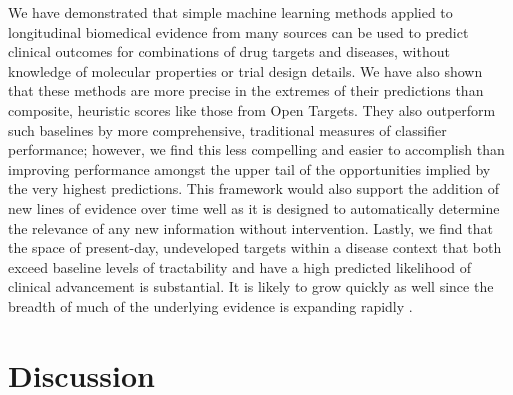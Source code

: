 \documentclass{article}
\begin{document}
We have demonstrated that simple machine learning methods applied to longitudinal biomedical evidence from many sources can be used to predict clinical outcomes for combinations of drug targets and diseases, without knowledge of molecular properties or trial design details. We have also shown that these methods are more precise in the extremes of their predictions than composite, heuristic scores like those from Open Targets. They also outperform such baselines by more comprehensive, traditional measures of classifier performance; however, we find this less compelling and easier to accomplish than improving performance amongst the upper tail of the opportunities implied by the very highest predictions. This framework would also support the addition of new lines of evidence over time well as it is designed to automatically determine the relevance of any new information without intervention.  Lastly, we find that the space of present-day, undeveloped targets within a disease context that both exceed baseline levels of tractability and have a high predicted likelihood of clinical advancement is substantial. It is likely to grow quickly as well since the breadth of much of the underlying evidence is expanding rapidly \cite{PMID:33214558,PMID:36634672,PMID:31491408}.

\section{Discussion}
\label{sec:discussion}
\end{document}
